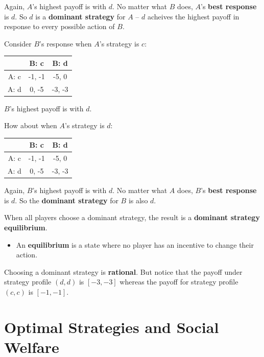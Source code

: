 \documentclass[11pt]{article}
\begin{document}
Again, \(A\)'s highest payoff is with \(d\).  No matter what \(B\) does, \(A\)'s \textbf{best response} is \(d\).  So \(d\) is a \textbf{dominant strategy} for \(A\) -- \(d\) acheives the highest payoff in response to every possible action of \(B\).




Consider \(B\)'s response when \(A\)'s strategy is \(c\):


\begin{tabular}{|c|c|c|}\hline
       & B: c         & B: d                                      \\\hline
A: c & \cellcolor{lightgray} -1, -1  & \cellcolor{lightgray} -5, 0 \\\hline
A: d & 0, -5                         & -3, -3                      \\\hline
\end{tabular}


\(B\)'s highest payoff is with \(d\).

How about when \(A\)'s strategy is \(d\):


\begin{tabular}{|c|c|c|}\hline
       & B: c         & B: d                                      \\\hline
A: c & -1, -1                      & -5, 0                         \\\hline
A: d & \cellcolor{lightgray} 0, -5 & \cellcolor{lightgray}-3, -3   \\\hline
\end{tabular}


Again, \(B\)'s highest payoff is with \(d\).  No matter what \(A\) does, \(B\)'s \textbf{best response} is \(d\).  So the \textbf{dominant strategy} for \(B\) is also \(d\).




When all players choose a dominant strategy, the result is a \textbf{dominant strategy equilibrium}.

\begin{itemize}
\item An \textbf{equilibrium} is a state where no player has an incentive to change their action.
\end{itemize}

Choosing a dominant strategy is \textbf{rational}.  But notice that the payoff under strategy profile \((d, d)\) is \([-3, -3]\) whereas the payoff for strategy profile \((c, c)\) is \([-1, -1]\).
\section{Optimal Strategies and Social Welfare}
\label{sec:org295f081}
\end{document}
